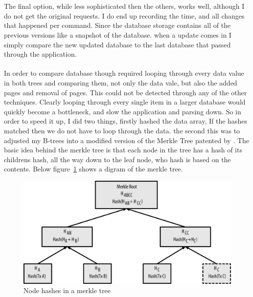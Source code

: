 \\\\
The final option, while less sophisticated then the others, works well, although I do not get the original requests. I do end up recording the time, and all changes that happened per command. Since the database storage contains all of the previous versions like a snapshot of the database. when a update comes in I simply compare the new updated database to the last database that passed through the application.
\\\\
In order to compare database though required looping through every data value in both trees and comparing them, not only the data vale, but also the added pages and removal of pages. This could not be detected through any of the other techniques. Clearly looping through every single item in a larger database would quickly become a bottleneck, and slow the application and parsing down. So in order to speed it up, I did two things, firstly hashed the data array, If the hashes matched then we do not have to loop through the data. the second this was to adjusted my B-trees into a modified version of the Merkle Tree patented by \cite{merkletree}. The basic idea behind the merkle tree is that each node in the tree has a hash of its childrens hash, all the way down to the leaf node, who hash is based on the contents. Below figure~\ref{fig:merkle_tree} shows a digram of the merkle tree.

\begin{figure}[H]
	\centering
	\includegraphics[scale=1.0]{images/merkle_tree.png}
	\caption{Node hashes in a  merkle tree \citep{bitcoin}}
	\label{fig:merkle_tree}
\end{figure}

